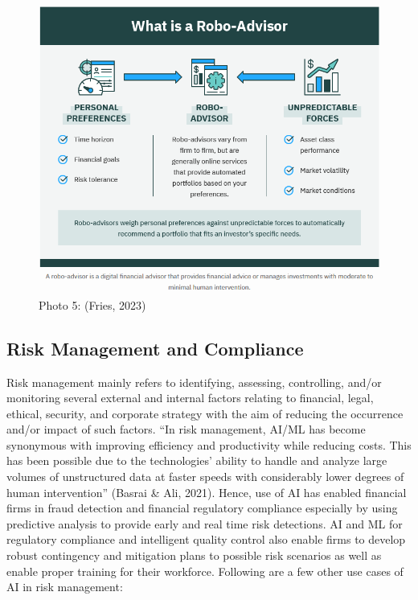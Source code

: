 \documentclass[
]{article}
\begin{document}
\begin{figure}
\centering
\includegraphics{roboadvisors.png}
\caption{Photo 5: (Fries, 2023)}
\end{figure}

\hypertarget{risk-management-and-compliance}{%
\subsection{Risk Management and Compliance}\label{risk-management-and-compliance}}

Risk management mainly refers to identifying, assessing, controlling, and/or monitoring several external and internal factors relating to financial, legal, ethical, security, and corporate strategy with the aim of reducing the occurrence and/or impact of such factors. ``In risk management, AI/ML has become synonymous with improving efficiency and productivity while reducing costs. This has been possible due to the technologies' ability to handle and analyze large volumes of unstructured data at faster speeds with considerably lower degrees of human intervention'' (Basrai \& Ali, 2021). Hence, use of AI has enabled financial firms in fraud detection and financial regulatory compliance especially by using predictive analysis to provide early and real time risk detections. AI and ML for regulatory compliance and intelligent quality control also enable firms to develop robust contingency and mitigation plans to possible risk scenarios as well as enable proper training for their workforce. Following are a few other use cases of AI in risk management:
\end{document}
